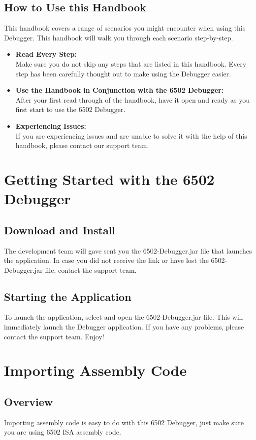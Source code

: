 \documentclass[a3paper, 11pt]{article}
\begin{document}
\subsection{How to Use this Handbook}
This handbook covers a range of scenarios you might encounter when using this Debugger. This handbook will walk you through each scenario step-by-step.
\begin{itemize}
	\item \textbf{Read Every Step:}\\
	Make sure you do not skip any steps that are listed in this handbook. Every step has been carefully thought out to make using the Debugger easier. 
	\item \textbf{Use the Handbook in Conjunction with the 6502 Debugger:}\\
	After your first read through of the handbook, have it open and ready as you first start to use the 6502 Debugger. 
	\item \textbf{Experiencing Issues:}\\
	If you are experiencing issues and are unable to solve it with the help of this handbook, please contact our support team. 
\end{itemize}
\pagebreak

\section{Getting Started with the 6502 Debugger}
\subsection{Download and Install}
The development team will gave sent you the 6502-Debugger.jar file that launches the application. In case you did not receive the link or have lost the 6502-Debugger.jar file, contact the support team. 
\subsection{Starting the Application}
To launch the application, select and open the 6502-Debugger.jar file. This will immediately launch the Debugger application. If you have any problems, please contact the support team. Enjoy!
\pagebreak

\section{Importing Assembly Code}
\subsection{Overview}
Importing assembly code is easy to do with this 6502 Debugger, just make sure you are using 6502 ISA assembly code.
\end{document}
